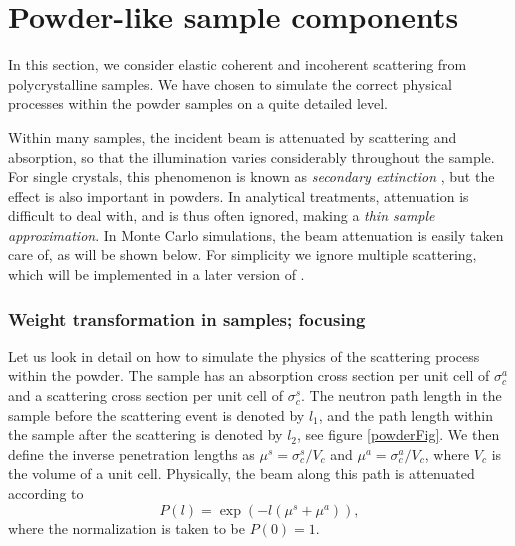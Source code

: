 
\chapter{Powder-like sample components}
\label{powder}
In this section, we consider elastic coherent and incoherent
scattering from polycrystalline samples. We have chosen to
simulate the correct physical processes within the powder
samples on a quite detailed level.

Within many samples,
the incident beam is attenuated by scattering and absorption,
so that the illumination varies considerably throughout the sample.
For single crystals, this phenomenon is known as
{\em secondary extinction} \cite{bacon}, but the effect is
also important in powders.
In analytical treatments, attenuation is difficult to deal with,
and is thus often ignored, making a {\em thin sample approximation}.
In Monte Carlo simulations, the beam attenuation
is easily taken care of, as will be shown below.
For simplicity we ignore multiple scattering, which will
be implemented in a later version of \MCS .

\subsection{Weight transformation in samples; focusing}
Let us look in detail on how to simulate the physics of the scattering
process within the powder.
The sample has an absorption cross section per unit cell of
$\sigma_c^a$ and a scattering cross section per unit cell
of $\sigma_c^s$. The neutron path length
in the sample before the scattering event is denoted by $l_1$, and
the path length within the sample after the scattering
is denoted by $l_2$, see figure \ref{powderFig}.
We then define the inverse penetration lengths as
$\mu^s = \sigma_c^s / V_c$ and $\mu^a = \sigma_c^a / V_c$, where
$V_c$ is the volume of a unit cell. Physically, the beam
along this path is attenuated according to
\begin{equation}
P(l) = \exp(- l (\mu^s + \mu^a)) ,
\end{equation}
where the normalization is taken to be $P(0)=1$.

